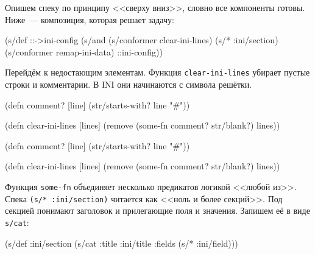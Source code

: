 Опишем спеку по принципу <<сверху вниз>>, словно все компоненты готовы. Ниже~---
композиция, которая решает задачу:

\begin{english}
  \begin{clojure}
(s/def ::->ini-config
  (s/and
   (s/conformer clear-ini-lines)
   (s/* :ini/section)
   (s/conformer remap-ini-data)
   ::ini-config))
  \end{clojure}
\end{english}


Перейдём к недостающим элементам. Функция \verb|clear-ini-lines| убирает
пустые строки и комментарии. В INI они начинаются с символа решётки.

\ifx\devicetype\mobile

\begin{english}
  \begin{clojure}
(defn comment? [line]
  (str/starts-with? line "#"))

(defn clear-ini-lines [lines]
  (remove
    (some-fn comment? str/blank?) lines))
  \end{clojure}
\end{english}

\else

\begin{english}
  \begin{clojure}
(defn comment? [line]
  (str/starts-with? line "#"))

(defn clear-ini-lines [lines]
  (remove (some-fn comment? str/blank?) lines))
  \end{clojure}
\end{english}

\fi


Функция \verb|some-fn| объединяет несколько предикатов логикой <<любой
из>>. Спека \verb|(s/* :ini/section)| читается как <<ноль и более
секций>>. Под секцией понимают заголовок и прилегающие поля и значения. Запишем
её в виде \verb|s/cat|:

\ifx\devicetype\mobile

\begin{english}
  \begin{clojure}
(s/def :ini/section
  (s/cat :title
    :ini/title :fields (s/* :ini/field)))
  \end{clojure}
\end{english}

